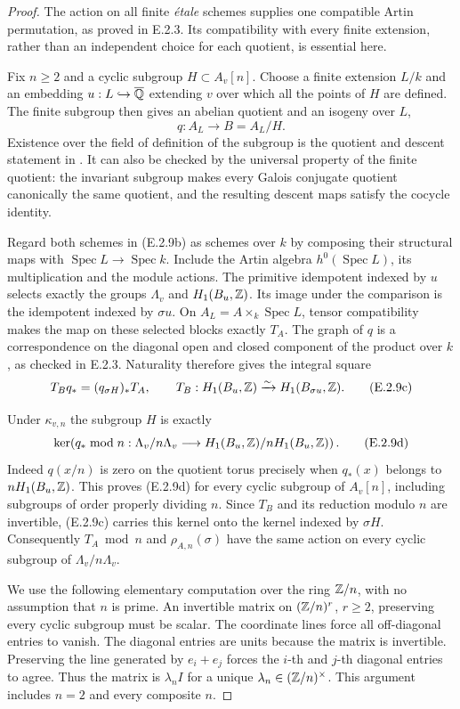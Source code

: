 \begin{proof}
The action on all finite \emph{\'etale} schemes supplies one compatible
Artin permutation, as proved in E.2.3. Its compatibility with every
finite extension, rather than an independent choice for each quotient,
is essential here.

Fix $n\ge2$ and a cyclic subgroup $H\subset A_v[n]$. Choose a finite
extension $L/k$ and an embedding $u:L\hookrightarrow\overline{\mathbb Q}$ extending
$v$ over which all the points of $H$ are defined. The finite subgroup
then gives an abelian quotient and an isogeny over $L$,
\[
 q:A_L\longrightarrow B=A_L/H.
 \tag{E.2.9b}
\]
Existence over the field of definition of the subgroup is the quotient
and descent statement in \cite[Chapter IV, Lemma~2.1, p.~135]{GenMilneAV2008}.
It can also be checked by the universal property of the finite quotient:
the invariant subgroup makes every Galois conjugate quotient canonically
the same quotient, and the resulting descent maps satisfy the cocycle
identity.

Regard both schemes in (E.2.9b) as schemes over $k$ by composing their
structural maps with $\operatorname{Spec}L\to\operatorname{Spec}k$.
Include the Artin algebra $h^0(\operatorname{Spec}L)$, its
multiplication and the module actions. The primitive idempotent
indexed by $u$ selects exactly the groups $\Lambda_v$ and
$H_1(B_u,\mathbb Z)$. Its image under the comparison is the idempotent
indexed by $\sigma u$. On $A_L=A\times_k\operatorname{Spec}L$,
tensor compatibility makes the map on these selected blocks exactly
$T_A$. The graph of $q$ is a correspondence on the diagonal open and
closed component of the product over $k$, as checked in E.2.3.
Naturality therefore gives the integral square
\[
 T_B q_*=(q_{\sigma H})_*T_A,
 \qquad
 T_B:H_1(B_u,\mathbb Z)\xrightarrow{\sim}H_1(B_{\sigma u},\mathbb Z).
 \tag{E.2.9c}
\]

Under $\kappa_{v,n}$ the subgroup $H$ is exactly
\[
 \ker\!\left(
    q_*\bmod n:\Lambda_v/n\Lambda_v
         \longrightarrow H_1(B_u,\mathbb Z)/nH_1(B_u,\mathbb Z)\right).
 \tag{E.2.9d}
\]
Indeed $q(x/n)$ is zero on the quotient torus precisely when
$q_*(x)$ belongs to $nH_1(B_u,\mathbb Z)$. This proves (E.2.9d) for every
cyclic subgroup of $A_v[n]$, including subgroups of order properly
dividing $n$. Since $T_B$ and its reduction modulo $n$ are invertible,
(E.2.9c) carries this kernel onto the kernel indexed by $\sigma H$.
Consequently $T_A\bmod n$ and $\rho_{A,n}(\sigma)$ have the same
action on every cyclic subgroup of $\Lambda_v/n\Lambda_v$.

We use the following elementary computation over the ring $\mathbb Z/n$,
with no assumption that $n$ is prime. An invertible matrix on
$(\mathbb Z/n)^r$, $r\ge2$, preserving every cyclic subgroup must be scalar.
The coordinate lines force all off-diagonal entries to vanish.
The diagonal entries are units because the matrix is invertible.
Preserving the line generated by $e_i+e_j$ forces the $i$-th and
$j$-th diagonal entries to agree. Thus the matrix is
$\lambda_n I$ for a unique $\lambda_n\in(\mathbb Z/n)^\times$.
This argument includes $n=2$ and every composite $n$.


\end{proof}
